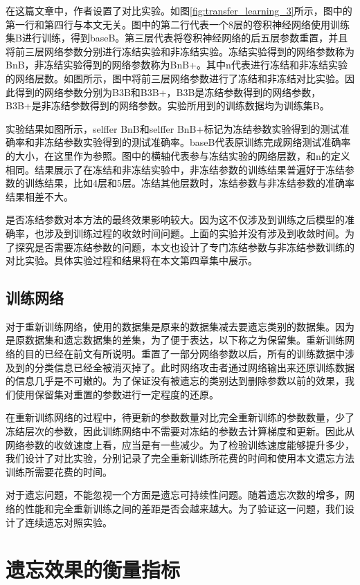 在这篇文章\cite{yosinski_2014_NIPS}中，作者设置了对比实验。如图\ref{fig:transfer_learning_3}所示，图中的第一行和第四行与本文无关。图中的第二行代表一个8层的卷积神经网络使用训练集B进行训练，得到baseB。第三层代表将卷积神经网络的后五层参数重置，并且将前三层网络参数分别进行冻结实验和非冻结实验。冻结实验得到的网络参数称为BnB，非冻结实验得到的网络参数称为BnB+。其中n代表进行冻结和非冻结实验的网络层数。如图所示，图中将前三层网络参数进行了冻结和非冻结对比实验。因此得到的网络参数分别为B3B和B3B+，B3B是冻结参数得到的网络参数，B3B+是非冻结参数得到的网络参数。实验所用到的训练数据均为训练集B。

实验结果如图所示，selffer BnB和selffer BnB+标记为冻结参数实验得到的测试准确率和非冻结参数实验得到的测试准确率。baseB代表原训练完成网络测试准确率的大小，在这里作为参照。图中的横轴代表参与冻结实验的网络层数，和n的定义相同。结果展示了在冻结和非冻结实验中，非冻结参数的训练结果普遍好于冻结参数的训练结果，比如4层和5层。冻结其他层数时，冻结参数与非冻结参数的准确率结果相差不大。

是否冻结参数对本方法的最终效果影响较大。因为这不仅涉及到训练之后模型的准确率，也涉及到训练过程的收敛时间问题。上面的实验并没有涉及到收敛时间。为了探究是否需要冻结参数的问题，本文也设计了专门冻结参数与非冻结参数训练的对比实验。具体实验过程和结果将在本文第四章集中展示。

\subsection{训练网络}

对于重新训练网络，使用的数据集是原来的数据集减去要遗忘类别的数据集。因为是原数据集和遗忘数据集的差集，为了便于表达，以下称之为保留集。重新训练网络的目的已经在前文有所说明。重置了一部分网络参数以后，所有的训练数据中涉及到的分类信息已经全被消灭掉了。此时网络攻击者通过网络输出来还原训练数据的信息几乎是不可嫩的。为了保证没有被遗忘的类别达到删除参数以前的效果，我们使用保留集对重置的参数进行一定程度的还原。

在重新训练网络的过程中，待更新的参数数量对比完全重新训练的参数数量，少了冻结层次的参数，因此训练网络中不需要对冻结的参数去计算梯度和更新。因此从网络参数的收敛速度上看，应当是有一些减少。为了检验训练速度能够提升多少，我们设计了对比实验，分别记录了完全重新训练所花费的时间和使用本文遗忘方法训练所需要花费的时间。

对于遗忘问题，不能忽视一个方面是遗忘可持续性问题。随着遗忘次数的增多，网络的性能和完全重新训练之间的差距是否会越来越大。为了验证这一问题，我们设计了连续遗忘对照实验。

\section{遗忘效果的衡量指标}


